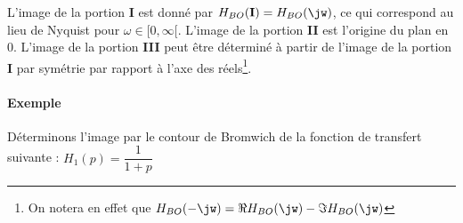L'image de la portion \textbf{I} est donné par 
$H_{BO}(\boldsymbol{\mathrm{I}})=H_{BO}(\jw)$, ce qui correspond au lieu de 
Nyquist pour $\omega\in[0,\infty[$. L'image de la portion \textbf{II} est 
l'origine du plan en 0. L'image de la portion \textbf{III} peut être 
déterminé à partir de l'image de la portion \textbf{I} par symétrie par 
rapport à l'axe des réels\footnote{On notera en effet que 
$H_{BO}(-\jw)=\Re{H_{BO}(\jw)}-\Im{H_{BO}(\jw)}$}.

\paragraph{Exemple}

Déterminons l'image par le contour de Bromwich de la fonction de transfert 
suivante : $H_1(p)=\dfrac{1}{1+p}$

